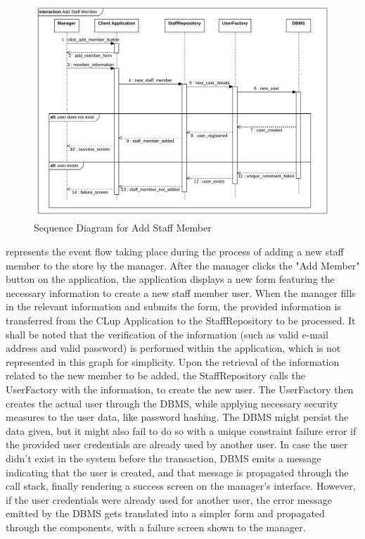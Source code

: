 \begin{figure}[H]
    \centering
    \includegraphics[height=0.5\textwidth]{Images/SequenceDiagrams/AddStaffMember.png}
    \caption{Sequence Diagram for Add Staff Member}
    \label{fig:SDAddStaffMember}
\end{figure}
 represents the event flow taking place during the process of adding a new staff member to the store by the manager.
After the manager clicks the "Add Member" button on the application, the application displays a new form featuring the necessary information to create a new staff member user.
When the manager fills in the relevant information and submits the form, the provided information is transferred from the CLup Application to the StaffRepository to be processed.
It shall be noted that the verification of the information (such as valid e-mail address and valid password) is performed within the application, which is not represented in this graph for simplicity.
Upon the retrieval of the information related to the new member to be added, the StaffRepository calls the UserFactory with the information, to create the new user.
The UserFactory then creates the actual user through the DBMS, while applying necessary security measures to the user data, like password hashing.
The DBMS might persist the data given, but it might also fail to do so with a unique constraint failure error if the provided user credentials are already used by another user.
In case the user didn't exist in the system before the transaction, DBMS emits a message indicating that the user is created, and that message is propagated through the call stack, finally rendering a success screen on the manager's interface.
However, if the user credentials were already used for another user, the error message emitted by the DBMS gets translated into a simpler form and propagated through the components, with a failure screen shown to the manager.


